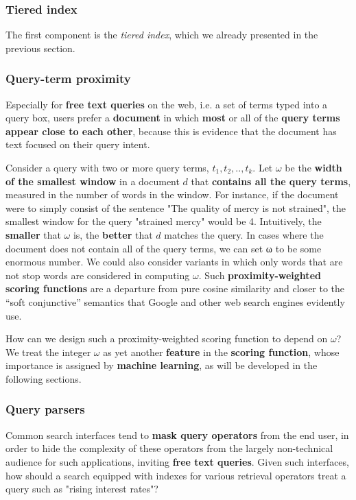 \subsubsection{Tiered index}
The first component is the \textit{tiered index}, which we already presented in the previous section.

\subsubsection{Query-term proximity}
Especially for \textbf{free text queries} on the web, i.e. a set of terms typed into a query box, users prefer a \textbf{document} in which \textbf{most} or all of the \textbf{query terms appear close to each other}, because this is evidence that the document has text focused on their query intent. 

Consider a query with two or more query terms, $t_1, t_2,.., t_k$. Let $\omega$ be the \textbf{width of the smallest window} in a document $d$ that \textbf{contains all the query terms}, measured in the number of words in the window. For instance, if the document were to simply consist of the sentence "The quality of mercy is not strained", the smallest window for the query "strained mercy" would be 4. Intuitively, the \textbf{smaller} that $\omega$ is, the \textbf{better} that $d$ matches the query. In cases where the document does not contain all of the query terms, we can set ω to be some enormous number. We could also consider variants in which only words that are not stop words are considered in computing $\omega$. Such \textbf{proximity-weighted scoring functions} are a departure from pure cosine similarity and closer to the “soft conjunctive” semantics that Google and other web search engines evidently use.

How can we design such a proximity-weighted scoring function to depend on $\omega$? We treat the integer $\omega$ as yet another \textbf{feature} in the \textbf{scoring function}, whose importance is assigned by \textbf{machine learning}, as will be developed in the following sections.

\subsubsection{Query parsers}
Common search interfaces tend to \textbf{mask query operators} from the end user, in order to hide the complexity of these operators from the largely non-technical audience for such applications, inviting \textbf{free text queries}. Given such interfaces, how should a search equipped with indexes for various retrieval operators treat a query such as "rising interest rates"? 

